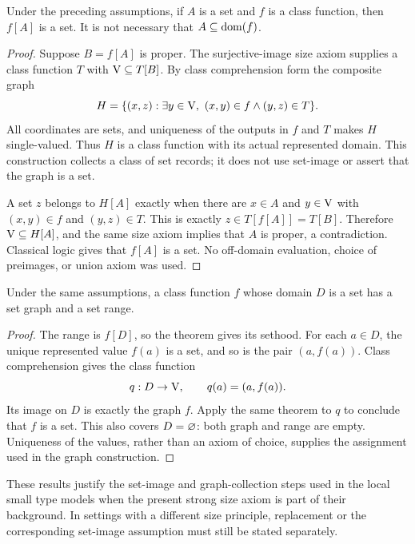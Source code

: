 \begin{theorem}
\label{thm:set_image_from_surjective_size}
Under the preceding assumptions, if $A$ is a set and $f$ is a
class function, then $f[A]$ is a set. It is not necessary that
$A\subseteq\mathrm{dom}(f)$.
\end{theorem}
\begin{proof}
Suppose $B=f[A]$ is proper. The surjective-image size axiom supplies a
class function $T$ with $\mathrm{V}\subseteq T[B]$. By class comprehension
form the composite graph
\[
H=\{(x,z):\exists y\in\mathrm{V},\ (x,y)\in f\land(y,z)\in T\}.
\]
All coordinates are sets, and uniqueness of the outputs in $f$ and $T$
makes $H$ single-valued. Thus $H$ is a class function with its actual
represented domain. This construction collects a class of set records;
it does not use set-image or assert that the graph is a set.

A set $z$ belongs to $H[A]$ exactly when there are $x\in A$ and
$y\in\mathrm{V}$ with $(x,y)\in f$ and $(y,z)\in T$. This is exactly
$z\in T[f[A]]=T[B]$. Therefore $\mathrm{V}\subseteq H[A]$, and the
same size axiom implies that $A$ is proper, a contradiction.
Classical logic gives that $f[A]$ is a set. No off-domain evaluation,
choice of preimages, or union axiom was used.
\end{proof}

\begin{corollary}
\label{thm:set_domain_set_graph}
Under the same assumptions, a class function $f$ whose domain $D$
is a set has a set graph and a set range.
\end{corollary}
\begin{proof}
The range is $f[D]$, so the theorem gives its sethood. For each
$a\in D$, the unique represented value $f(a)$ is a set, and so is
the pair $(a,f(a))$. Class comprehension gives the class function
\[
q:D\to\mathrm{V},\qquad q(a)=(a,f(a)).
\]
Its image on $D$ is exactly the graph $f$. Apply the same theorem
to $q$ to conclude that $f$ is a set. This also covers $D=\varnothing$:
both graph and range are empty. Uniqueness of the values, rather than
an axiom of choice, supplies the assignment used in the graph construction.
\end{proof}

These results justify the set-image and graph-collection steps used in
the local small type models when the present strong size axiom is part
of their background. In settings with a different size principle,
replacement or the corresponding set-image assumption must still be
stated separately.

